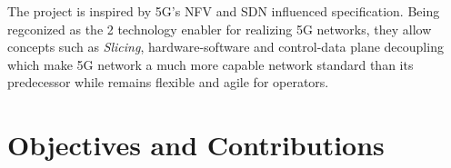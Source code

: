 The project is inspired by \ac{5G}'s \ac{NFV} and \ac{SDN} influenced specification.
Being regconized as the 2 technology enabler for realizing 5G networks, they allow concepts such as \textit{Slicing}, hardware-software and control-data plane decoupling \cite{yousaf_nfv_sdn_key_techno_for_5g2017} \cite{open_baton} which make \ac{5G} network a much more capable network standard than its predecessor while remains flexible and agile for operators.




\section{Objectives and Contributions}






